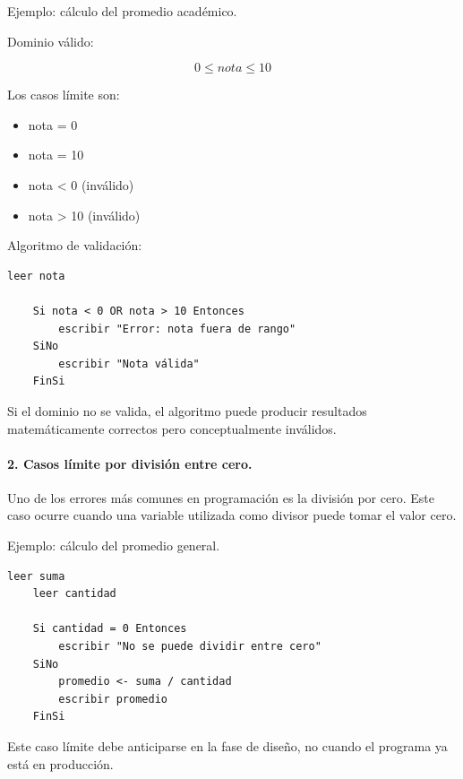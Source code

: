 \documentclass[12pt,twoside]{book}
\begin{document}
						Ejemplo: cálculo del promedio académico.
						
						Dominio válido:
						
						\[
						0 \leq nota \leq 10
						\]
						
						Los casos límite son:
						
						\begin{itemize}
							\item nota = 0
							\item nota = 10
							\item nota < 0 (inválido)
							\item nota > 10 (inválido)
						\end{itemize}
						
						Algoritmo de validación:
						
						\begin{lstlisting}[style=upsamStyle, caption={Validación de nota dentro del dominio permitido.}, label={lst:ValidacionNota}, basicstyle=\small\ttfamily]
	leer nota
	
	Si nota < 0 OR nota > 10 Entonces
		escribir "Error: nota fuera de rango"
	SiNo
		escribir "Nota válida"
	FinSi \end{lstlisting}
						
						Si el dominio no se valida, el algoritmo puede producir resultados matemáticamente correctos pero conceptualmente inválidos.
						
						\paragraph{2. Casos límite por división entre cero.} Uno de los errores más comunes en programación es la división por cero. Este caso ocurre cuando una variable utilizada como divisor puede tomar el valor cero.
						
						Ejemplo: cálculo del promedio general.
						
						\begin{lstlisting}[style=upsamStyle, caption={Control de división por cero en cálculo de promedio.}, label={lst:DivisionCero}, basicstyle=\small\ttfamily]
	leer suma
	leer cantidad
	
	Si cantidad = 0 Entonces
		escribir "No se puede dividir entre cero"
	SiNo
		promedio <- suma / cantidad
		escribir promedio
	FinSi \end{lstlisting}
						
						Este caso límite debe anticiparse en la fase de diseño, no cuando el programa ya está en producción.
						
\end{document}
